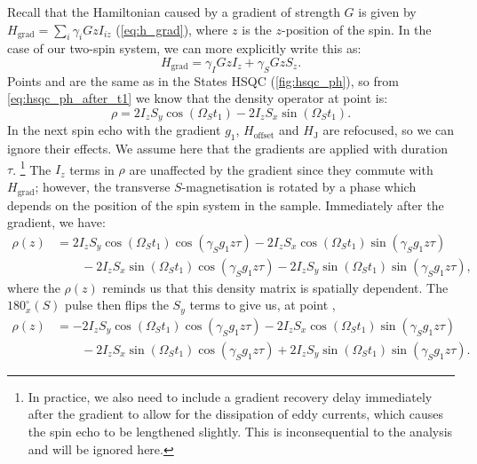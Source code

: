 Recall that the Hamiltonian caused by a gradient of strength $G$ is given by $H_\text{grad} = \sum_i \gamma_i Gz I_{iz}$ (\cref{eq:h_grad}), where $z$ is the $z$-position of the spin.
In the case of our two-spin system, we can more explicitly write this as:
\begin{equation}
    \label{eq:h_grad_is_system}
    H_\text{grad} = \gamma_I Gz I_z + \gamma_S Gz S_z.
\end{equation}
Points  and  are the same as in the States HSQC (\cref{fig:hsqc_ph}), so from \cref{eq:hsqc_ph_after_t1} we know that the density operator at point  is:
\begin{equation}
    \label{eq:hsqc_ea_prodop_2}
    \rho = 2I_zS_y\cos(\Omega_S t_1) - 2I_zS_x \sin(\Omega_S t_1).
\end{equation}
In the next spin echo with the gradient $g_1$, $H_\text{offset}$ and $H_\text{J}$ are refocused, so we can ignore their effects.
We assume here that the gradients are applied with duration $\tau$.%
\footnote{In practice, we also need to include a gradient recovery delay immediately after the gradient to allow for the dissipation of eddy currents, which causes the spin echo to be lengthened slightly. This is inconsequential to the analysis and will be ignored here.}
The $I_z$ terms in $\rho$ are unaffected by the gradient since they commute with $H_\text{grad}$; however, the transverse $S$-magnetisation is rotated by a phase which depends on the position of the spin system in the sample.
Immediately after the gradient, we have:
\begin{equation}
    \label{eq:hsqc_ea_gradient}
    \begin{aligned}
        \rho(z) &= 2I_zS_y\cos(\Omega_S t_1)\cos(\gamma_S g_1 z \tau) - 2I_zS_x\cos(\Omega_S t_1)\sin(\gamma_S g_1 z \tau) \\
                &\quad\quad {} - 2I_zS_x \sin(\Omega_S t_1)\cos(\gamma_S g_1 z \tau) - 2I_zS_y\sin(\Omega_S t_1)\sin(\gamma_S g_1 z \tau),
    \end{aligned}
\end{equation}
where the $\rho(z)$ reminds us that this density matrix is spatially dependent.
The $180^\circ_x(S)$ pulse then flips the $S_y$ terms to give us, at point ,
\begin{equation}
    \label{eq:hsqc_ea_after_grad_echo}
    \begin{aligned}
        \rho(z) &= -2I_zS_y\cos(\Omega_S t_1)\cos(\gamma_S g_1 z \tau) - 2I_zS_x\cos(\Omega_S t_1)\sin(\gamma_S g_1 z \tau) \\
                &\quad\quad {} - 2I_zS_x \sin(\Omega_S t_1)\cos(\gamma_S g_1 z \tau) + 2I_zS_y\sin(\Omega_S t_1)\sin(\gamma_S g_1 z \tau).
    \end{aligned}
\end{equation}
